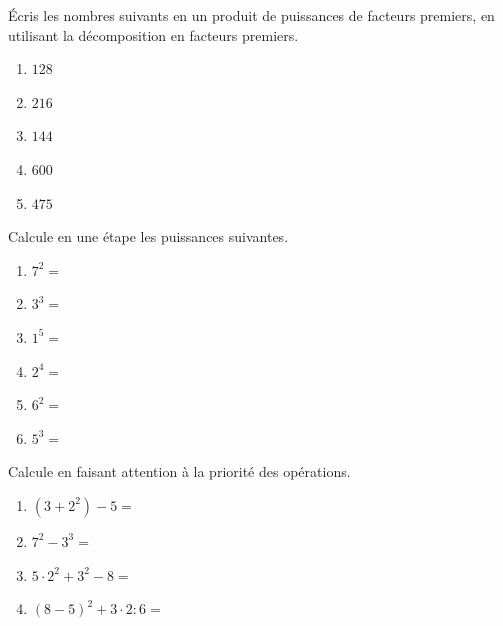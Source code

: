 \documentclass[../../syllabus_1.tex]{subfiles}
\begin{document}
\begin{exercise}
      Écris les nombres suivants en un produit de puissances de facteurs premiers, en utilisant la décomposition en facteurs premiers.
      \begin{enumerate}[cols=5, label=\ ]
            \item $128$
            \item $216$
            \item $144$
            \item $600$
            \item $475$
      \end{enumerate}
      \vspace{15em}
\end{exercise}
\newpage

%
\begin{exercise}
      Calcule en une étape les puissances suivantes.
      \begin{enumerate}[cols=3]
            \item $7^2=$
            \item $3^3=$
            \item $1^5=$
            \item $2^4=$
            \item $6^2=$
            \item $5^3=$
      \end{enumerate}
\end{exercise}

\begin{exercise}
      Calcule en faisant attention à la priorité des opérations.
      \begin{enumerate}[cols=2, itemsep=6em]
            \item $\left(3+2^2\right)-5 = $
            \item $7^2 - 3^3 = $
            \item $5\cdot 2^2 + 3^2 - 8 = $
            \item $\left(8-5\right)^2 + 3 \cdot 2 : 6 =$
      \end{enumerate}
\end{exercise}
\end{document}

